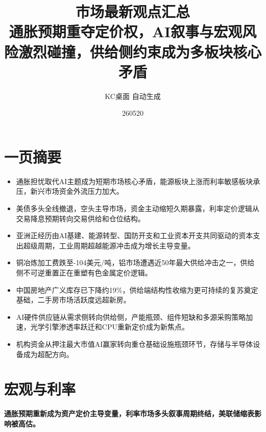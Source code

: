 \documentclass[11pt]{ctexart}
\title{\textbf{市场最新观点汇总}\\[0.4em]{\large 通胀预期重夺定价权，AI叙事与宏观风险激烈碰撞，供给侧约束成为多板块核心矛盾}}
\author{KC桌面 自动生成}
\date{260520}
\begin{document}
\maketitle
\section*{一页摘要}
\begin{itemize}
  \item 通胀担忧取代AI主题成为短期市场核心矛盾，能源板块上涨而利率敏感板块承压，新兴市场资金外流压力加大。
  \item 美债多头全线撤退，空头主导市场，资金主动缩短久期暴露，利率定价逻辑从交易降息预期转向交易供给和仓位结构。
  \item 亚洲正经历由AI基建、能源转型、国防开支和工业资本开支共同驱动的资本支出超级周期，工业周期超越能源冲击成为增长主导变量。
  \item 铜冶炼加工费跌至-104美元/吨，铝市场遭遇近50年最大供给冲击之一，供给侧不可逆重置正在重塑有色金属定价逻辑。
  \item 中国房地产广义库存已下降约19\%，供给端结构性收缩为更可持续的复苏奠定基础，二手房市场活跃度远超新房。
  \item AI硬件供应链从需求侧转向供给侧，产能瓶颈、组件短缺和多源采购策略加速，光学引擎渗透率跃迁和CPU重新定价成为新焦点。
  \item 机构资金从押注最大市值AI赢家转向重仓基础设施瓶颈环节，存储与半导体设备成为超配方向。
\end{itemize}
\section{宏观与利率}
\textbf{通胀预期重新成为资产定价主导变量，利率市场多头叙事周期终结，美联储缩表影响被高估。}
\end{document}
